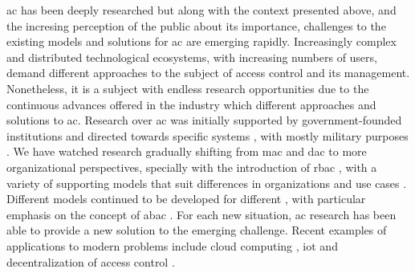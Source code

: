 \gls{ac} has been deeply researched but along with the context presented above, and the incresing perception of the public about its importance, challenges to the existing models and solutions for \gls{ac} are emerging rapidly. Increasingly complex and distributed technological ecosystems, with increasing numbers of users, demand different approaches to the subject of access
control and its management. Nonetheless, it is a subject with endless research opportunities due to the continuous advances offered in the industry which different approaches and solutions to \gls{ac}. Research over \gls{ac} was initially supported by government-founded institutions \cite{lampson_protection_1974, graham_protection:_1972, harrison_protection_1976} and directed towards specific systems \cite{weissman_security_1969,  organick_multics_1972, satyanarayanan_integrating_1989}, with mostly military purposes \cite{biba_integrity_1977, bell_secure_1973}. We have watched research gradually shifting from \gls{mac} \cite{bell_secure_1973, denning_lattice_1976, biba_integrity_1977, sandhu_lattice-based_1993} and \gls{dac} \cite{weissman_security_1969,  organick_multics_1972, graham_protection:_1972,lampson_protection_1974, harrison_protection_1976, sandhu_typed_1992} to more organizational perspectives, specially with the introduction of \gls{rbac} \cite{ferraiolo_role-based_1992, sandhu_role-based_1996}, with a variety of supporting models \cite{bertino_trbac:_2000, chakraborty_trustbac:_2006, joshi_generalized_2005, ray_lrbac:_2006, thomas_team-based_1997}  that suit differences in organizations and use cases \cite{barkley_role_1997, gavrila_formal_1998, park_rbac_1999, park_role-based_2003}. Different models continued to be developed for different \cite{park_towards_2002, kalam_organization_2003, sandhu_usage_2003}, with particular emphasis on the concept of \gls{abac} \cite{wang_logic-based_2004, yuan_attributed_2005, goyal_attribute-based_2006, wang_hierarchical_2010, yu_attribute_2010, hu_guide_2014}. For each new situation, \gls{ac} research has been able to provide a new solution to the emerging challenge. Recent examples of applications to modern problems include cloud computing \cite{wang_hierarchical_2010, yu_attribute_2010, wan_hasbe:_2012, ruj_dacc:_2011,calero_toward_2010}, \gls{iot} \cite{ouaddah_access_2017, dorri_blockchain_2017} and decentralization of access control \cite{sandhu_peer--peer_2005, sandhu_decentralized_1998, miltchev_decentralized_2008}.

